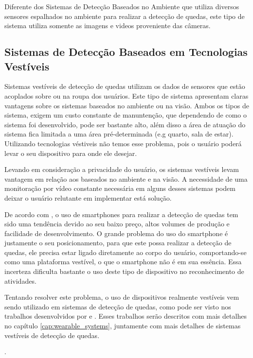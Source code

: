 Diferente dos Sistemas de Detecção Baseados no Ambiente que utiliza diversos sensores espalhados no ambiente para realizar a detecção de quedas, este tipo de sistema utiliza somente as imagens e videos proveniente das câmeras.

\subsection{Sistemas de Detecção Baseados em Tecnologias Vestíveis}
Sistemas vestíveis de detecção de quedas utilizam os dados de sensores que estão acoplados sobre ou na roupa dos usuários. Este tipo de sistema apresentam claras vantagens sobre os sistemas baseados no ambiente ou na visão. Ambos os tipos de sistema, exigem um custo constante de manuntenção, que dependendo de como o sistema foi desenvolvido, pode ser bastante alto, além disso a área de atuação do sistema fica limitada a uma área pré-determinada (e.g quarto, sala de estar). Utilizando tecnologias véstiveis não temos esse problema, pois o usuário poderá levar o seu dispositivo para onde ele desejar.

Levando em consideração a privacidade do usuário, os sistemas vestíveis levam vantagem em relação aos baseados no ambiente e na visão. A necessidade de uma monitoração por vídeo constante necessária em alguns desses sistemas podem deixar o usuário relutante em implementar está solução. 

De acordo com \cite{igual2013challenges}, o uso de smartphones para realizar a detecção de quedas tem sido uma tendência devido ao seu baixo preço, altos volumes de produção e facilidade de desenvolvimento. O grande problema do uso do smartphone é justamente o seu posicionamento, para que este possa realizar a detecção de quedas, ele precisa estar ligado diretamente ao corpo do usuário, comportando-se como uma plataforma vestível, o que o smartphone não é em sua essência. Essa incerteza dificulta bastante o uso deste tipo de dispositivo no reconhecimento de atividades. 

Tentando resolver este problema, o uso de dispositivos realmente vestíveis vem sendo utilizado em sistemas de detecção de quedas, como pode ser visto nos trabalhos desenvolvidos por \cite{hsieh2014wrist} e \cite{degen2003speedy}. Esses trabalhos serão descritos com mais detalhes no capítulo \ref{cap:wearable_systems}, juntamente com mais detalhes de sistemas vestíveis de detecção de quedas.



.


